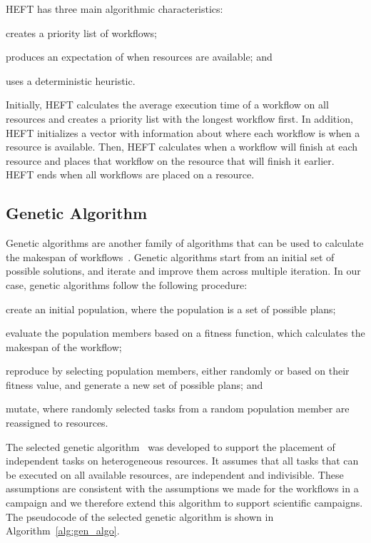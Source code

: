 HEFT has three main algorithmic characteristics:
\begin{inparaenum}[(1)]
    \item creates a priority list of workflows;
    \item produces an expectation of when resources are available; and
    \item uses a deterministic heuristic.
\end{inparaenum}
Initially, HEFT calculates the average execution time of a workflow on all
resources and creates a priority list with the longest workflow first. In
addition, HEFT initializes a vector with information about where each workflow
is when a resource is available. Then, HEFT calculates when a workflow will
finish at each resource and places that workflow on the resource that will finish
it earlier. HEFT ends when all workflows are placed on a resource.


\subsection{Genetic Algorithm}
\label{algo:gen}

Genetic algorithms are another family of algorithms that can be  used to
calculate the makespan of workflows~\cite{dong2006scheduling}. Genetic
algorithms start from an initial set of possible solutions, and iterate and
improve them across multiple iteration. In our case, genetic algorithms follow
the following procedure:
\begin{inparaenum}[(i)]
    \item create an initial population, where the population is a set of
    possible plans;
    \item evaluate the population members based on a fitness function, which
    calculates the makespan of the workflow;
    \item reproduce by selecting population members, either randomly or based
    on their fitness value, and generate a new set of possible plans; and
    \item mutate, where randomly selected tasks from a random population
    member are reassigned to resources.
\end{inparaenum}

The selected genetic algorithm~\cite{page2005algorithm} was developed to support
the placement of independent tasks on heterogeneous resources. It assumes that
all tasks that can be executed on all available resources, are independent and
indivisible. These assumptions are consistent with the assumptions we made for
the workflows in a campaign and we therefore extend this algorithm to support
scientific campaigns. The pseudocode of the selected genetic algorithm is shown
in Algorithm~\ref{alg:gen_algo}.

